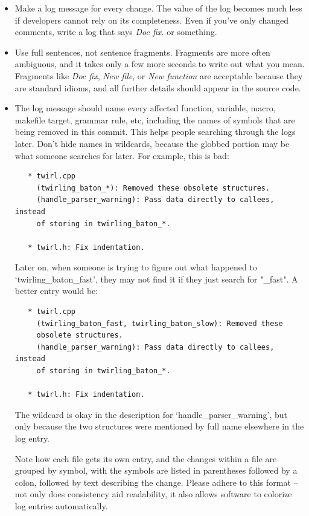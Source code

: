 \documentclass[headexclude,footexclude,12pt,BCOR0pt,DIV15]{scrartcl}
\begin{document}
    \begin{itemize}
    \item Make a log message for every change.  The value of the log becomes
        much less if developers cannot rely on its completeness.  Even if
        you've only changed comments, write a log that says \emph{Doc fix.} or
        something.

    \item Use full sentences, not sentence fragments.  Fragments are more often
        ambiguous, and it takes only a few more seconds to write out what you
        mean.  Fragments like \emph{Doc fix}, \emph{New file}, or \emph{New function} are
        acceptable because they are standard idioms, and all further details
        should appear in the source code.

    \item The log message should name every affected function, variable, macro,
        makefile target, grammar rule, etc, including the names of symbols
        that are being removed in this commit.  This helps people searching
        through the logs later.  Don't hide names in wildcards, because the
        globbed portion may be what someone searches for later.  For example,
        this is bad:
\begin{Verbatim}
   * twirl.cpp
     (twirling_baton_*): Removed these obsolete structures.
     (handle_parser_warning): Pass data directly to callees, instead
     of storing in twirling_baton_*.

   * twirl.h: Fix indentation.
\end{Verbatim}
        Later on, when someone is trying to figure out what happened to
        `twirling\_baton\_fast', they may not find it if they just search for
        "\_fast".  A better entry would be:
\begin{Verbatim}
   * twirl.cpp
     (twirling_baton_fast, twirling_baton_slow): Removed these
     obsolete structures.
     (handle_parser_warning): Pass data directly to callees, instead
     of storing in twirling_baton_*.

   * twirl.h: Fix indentation.
\end{Verbatim}

        The wildcard is okay in the description for `handle\_parser\_warning',
        but only because the two structures were mentioned by full name
        elsewhere in the log entry.

        Note how each file gets its own entry, and the changes within a file
        are grouped by symbol, with the symbols are listed in parentheses
        followed by a colon, followed by text describing the change.  Please
        adhere to this format -- not only does consistency aid readability, it
        also allows software to colorize log entries automatically.


\end{itemize}
\end{document}
